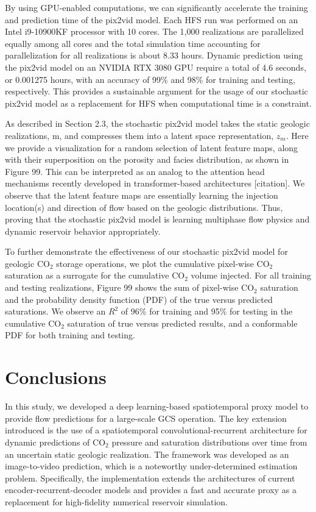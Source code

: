 \documentclass[default,iicol]{sn-jnl}
\begin{document}
By using GPU-enabled computations, we can significantly accelerate the training and prediction time of the pix2vid model. Each HFS run was performed on an Intel \textregistered i9-10900KF processor with 10 cores. The 1,000 realizations are parallelized equally among all cores and the total simulation time accounting for parallelization for all realizations is about 8.33 hours. Dynamic prediction using the pix2vid model on an NVIDIA RTX 3080 GPU require a total of 4.6 seconds, or 0.001275 hours, with an accuracy of 99\% and 98\% for training and testing, respectively. This provides a sustainable argument for the usage of our stochastic pix2vid model as a replacement for HFS when computational time is a constraint.

As described in Section 2.3, the stochastic pix2vid model takes the static geologic realizations, m, and compresses them into a latent space representation, $z_m$. Here we provide a visualization for a random selection of latent feature maps, along with their superposition on the porosity and facies distribution, as shown in Figure 99. This can be interpreted as an analog to the attention head mechanisms recently developed in transformer-based architectures [citation]. We observe that the latent feature maps are essentially learning the injection location(s) and direction of flow based on the geologic distributions. Thus, proving that the stochastic pix2vid model is learning multiphase flow physics and dynamic reservoir behavior appropriately.

To further demonstrate the effectiveness of our stochastic pix2vid model for geologic CO$_2$ storage operations, we plot the cumulative pixel-wise CO$_2$ saturation as a surrogate for the cumulative CO$_2$ volume injected. For all training and testing realizations, Figure 99 shows the sum of pixel-wise CO$_2$ saturation and the probability density function (PDF) of the true versus predicted saturations. We observe an $R^2$ of 96\% for training and 95\% for testing in the cumulative CO$_2$ saturation of true versus predicted results, and a conformable PDF for both training and testing.

\section{Conclusions}\label{sec4_conclusions}
In this study, we developed a deep learning-based spatiotemporal proxy model to provide flow predictions for a large-scale GCS operation. The key extension introduced is the use of a spatiotemporal convolutional-recurrent architecture for dynamic predictions of CO$_2$ pressure and saturation distributions over time from an uncertain static geologic realization. The framework was developed as an image-to-video prediction, which is a noteworthy under-determined estimation problem. Specifically, the implementation extends the architectures of current encoder-recurrent-decoder models and provides a fast and accurate proxy as a replacement for high-fidelity numerical reservoir simulation.
\end{document}
